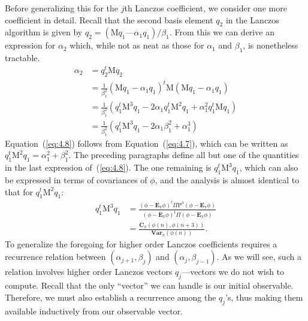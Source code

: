\documentclass[12pt,letterpaper]{report}
\theoremstyle{plain}
\theoremstyle{definition}
\theoremstyle{remark}
\numberwithin{theorem}{chapter}
\numberwithin{claim}{chapter}
\numberwithin{equation}{chapter}
\numberwithin{conjecture}{chapter}
\newcommand\bC{\ensuremath{\mathbf{C}}}
\renewcommand\P{\ensuremath{\mathrm{P}}}
\newcommand\M{\ensuremath{\mathrm{M}}}
\newcommand\bE{\ensuremath{\mathbf{E}}}
\newcommand\Var{\ensuremath{\mathbf{Var}}}
\newcommand\<{\ensuremath{\langle}}
\renewcommand\>{\ensuremath{\rangle}}
\begin{document}
Before generalizing this for the $j$th Lanczos coefficient, we consider one more coefficient
in detail. Recall that the second basis element $q_2$ in the Lanczos algorithm is given by 
$q_2 = (\M q_1 — \alpha_1 q_1)/\beta_1$. 
From this we can derive an expression for $\alpha_2$ which, while not as neat as those
%
%
%
%
for $\alpha_1$ and $\beta_1$, is nonetheless tractable.
\begin{align}
\label{eq:4.8}
\alpha_2 &= q_2^t \M q_2 \nonumber\\
&= \frac{1}{\beta_1^2}(\M q_1 - \alpha_1 q_1)^t\M (\M q_1 - \alpha_1 q_1)\nonumber\\
&= \frac{1}{\beta_1^2}(q_1^t\M^3 q_1 - 2\alpha_1 q_1^t\M^2 q_1 + \alpha_1^2q_1^t\M q_1 )\nonumber\\
&= \frac{1}{\beta_1^2}(q_1^t\M^3 q_1 - 2\alpha_1 \beta_1^2 + \alpha_1^3 )
\end{align}
Equation~(\ref{eq:4.8}) follows from Equation~(\ref{eq:4.7}), which can be
written as $q_1^t\M^2 q_1 = \alpha_1^2 + \beta_1^2$.  
The preceding paragraphs define all but one of the quantities in the last
expression of~(\ref{eq:4.8}). The one remaining
is $q_1^t\M^3 q_1$, which can also be expressed in terms of covariances of $\phi$,
and the analysis is almost identical to that for $q_1^t\M^2q_1$:
\begin{align*}
q_1^t\M^3 q_1  &= \frac{(\phi - \bE_\pi\phi)^t\Pi \P^3(\phi- \bE_\pi \phi)}
{(\phi - \bE_\pi\phi)^t\Pi (\phi- \bE_\pi \phi)} \\[8pt]
&= \frac{\bC_\pi (\phi(n), \phi(n + 3))}{\Var_\pi(\phi(n))}.
\end{align*}
To generalize the foregoing for higher order Lanczos coefficients requires a recurrence
relation between $(\alpha_{j+1}, \beta_j)$ and $(\alpha_{j}, \beta_{j-1})$. 
As we will see, such a relation involves higher order
Lanczos vectors $q_j$---vectors we do not wish to compute. Recall that the only ``vector'' we can
handle is our initial observable. Therefore, we must also establish a recurrence
among the $q_j$'s, thus making them available inductively from our observable vector.
\end{document}
